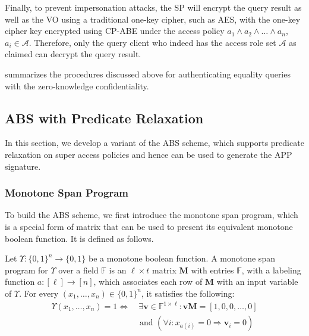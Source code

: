 Finally, to prevent impersonation attacks, the SP will encrypt the query result as well as the VO using a traditional one-key cipher, such as AES, with the one-key cipher key encrypted using CP-ABE under the access policy $a_1 \land a_2 \land \dots \land a_n$, $a_i \in \mathcal{A}$. Therefore, only the query client who indeed has the access role set $\mathcal{A}$ as claimed can decrypt the query result.

 summarizes the procedures discussed above for authenticating equality queries with the zero-knowledge confidentiality.
\subsection{ABS with Predicate Relaxation}\label{sec:access-control:abs}

In this section, we develop a variant of the ABS scheme, which supports predicate relaxation   on super access policies and hence can be used to generate the APP signature\@.

\subsubsection{Monotone Span Program}\label{sec:access-control:msp}

To build the ABS scheme, we first introduce the monotone span program, which is a special form of matrix that can be used to present its equivalent monotone boolean function. It is defined as follows.

\begin{definition}
  Let $\Upsilon : {\{0, 1\}}^n \to \{0, 1\}$ be a monotone boolean function. A monotone span program for $\Upsilon$ over a field $\mathbb{F}$ is an $\ell \times t$ matrix $\mathbf{M}$ with entries $\mathbb{F}$,  with a labeling function $a: [\ell] \to [n]$, which associates each row of $\mathbf{M}$ with an input variable of $\Upsilon$. For every $(x_1, \dots, x_n) \in {\{0, 1\}}^n$, it satisfies the following:
  \begin{align*}
    \Upsilon(x_1, \dots, x_n) = 1 \Longleftrightarrow & \ \exists \mathbf{v} \in \mathbb{F}^{1 \times \ell}: \mathbf{v}\mathbf{M} = [1, 0, 0, \dots, 0] \\
                                                      & \text{ and } (\forall i: x_{a(i)} = 0 \Rightarrow \mathbf{v}_i = 0)
  \end{align*}
\end{definition}

